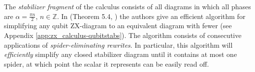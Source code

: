 The \emph{stabilizer fragment} of the calculus consists of all diagrams in which all phases are $\alpha=\frac{\pi n}{2}$, $n\in\mathbb{Z}$.
In (Theorem 5.4, \cite{graph_theoretic_simplification}) the authors give an efficient algorithm for simplifying any qubit ZX-diagram to an equivalent diagram with fewer (see Appendix \ref{app:zx_calculus-qubitstabs}).
The algorithm consists of consecutive applications of
\emph{spider-eliminating rewrites}.
In particular,
this algorithm will \emph{efficiently} simplify any closed stabilizer diagram until it contains at most one spider, at which point the scalar it represents can be easily read off. 
